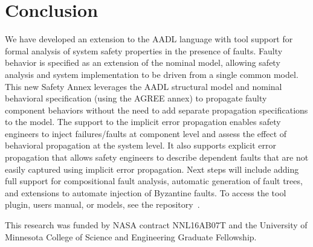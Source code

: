 \section{Conclusion}


We have developed an extension to the AADL language with tool support for formal analysis of system safety properties in the presence of faults. Faulty behavior is specified as an extension of the nominal model, allowing safety analysis and system implementation to be driven from a single common model. This new Safety Annex leverages the AADL structural model and nominal behavioral specification (using the AGREE annex) to propagate faulty component behaviors without the need to add separate propagation specifications to the model. The support to the implicit %
error propagation enables safety engineers to inject failures/faults at component level and assess the effect of behavioral propagation at the system level. It also supports explicit 
error propagation that allows safety engineers to describe dependent faults that are not easily captured using implicit %
error propagation. Next steps will include adding full support for compositional fault analysis, automatic generation of fault trees, and extensions to automate injection of Byzantine faults. To access the tool plugin, users manual, or models, see the repository~\cite{SAGithub}. 

\vspace{2 mm}
 This research was funded by NASA contract NNL16AB07T and the University of Minnesota College of Science and Engineering Graduate Fellowship.


